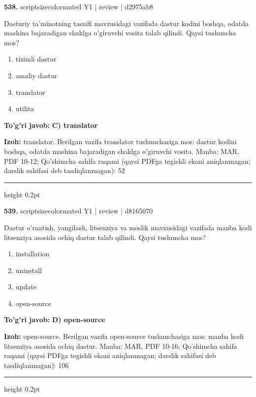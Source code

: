 \documentclass[10pt,a4paper]{article}
\begin{document}
{\bfseries\sffamily\color{ink} 538.} {scriptsizecolor{muted} Y1 | review | d2975ab8}
\par
Dasturiy ta'minotning tasnifi mavzusidagi vazifada dastur kodini boshqa, odatda mashina bajaradigan shaklga o'giruvchi vosita talab qilindi. Qaysi tushuncha mos?
\begin{enumerate}[label=\Alph*),leftmargin=9mm]
\item tizimli dastur
\item amaliy dastur
\item translator
\item utilita
\end{enumerate}
\begin{tcolorbox}[enhanced,breakable,colback=teal!4,colframe=teal!60!black,boxrule=0.45pt,arc=1.2mm,left=2.7mm,right=2.7mm,top=1.8mm,bottom=1.8mm,before skip=2mm,after skip=2mm]
{\bfseries\sffamily\color{teal}To'g'ri javob:} \textbf{C) translator}
\par\smallskip
{\bfseries Izoh:} translator. Berilgan vazifa translator tushunchasiga mos: dastur kodini boshqa, odatda mashina bajaradigan shaklga o'giruvchi vosita. Manba: MAR, PDF 10-12; Qo'shimcha sahifa raqami (qaysi PDFga tegishli ekani aniqlanmagan; darslik sahifasi deb tasdiqlanmagan): 52
\end{tcolorbox}
\vspace{2mm}\hrule height 0.2pt\vspace{3mm}

{\bfseries\sffamily\color{ink} 539.} {scriptsizecolor{muted} Y1 | review | d8165070}
\par
Dastur o'rnatish, yangilash, litsenziya va moslik mavzusidagi vazifada manba kodi litsenziya asosida ochiq dastur talab qilindi. Qaysi tushuncha mos?
\begin{enumerate}[label=\Alph*),leftmargin=9mm]
\item installation
\item uninstall
\item update
\item open-source
\end{enumerate}
\begin{tcolorbox}[enhanced,breakable,colback=teal!4,colframe=teal!60!black,boxrule=0.45pt,arc=1.2mm,left=2.7mm,right=2.7mm,top=1.8mm,bottom=1.8mm,before skip=2mm,after skip=2mm]
{\bfseries\sffamily\color{teal}To'g'ri javob:} \textbf{D) open-source}
\par\smallskip
{\bfseries Izoh:} open-source. Berilgan vazifa open-source tushunchasiga mos: manba kodi litsenziya asosida ochiq dastur. Manba: MAR, PDF 10-16; Qo'shimcha sahifa raqami (qaysi PDFga tegishli ekani aniqlanmagan; darslik sahifasi deb tasdiqlanmagan): 106
\end{tcolorbox}
\vspace{2mm}\hrule height 0.2pt\vspace{3mm}
\end{document}
